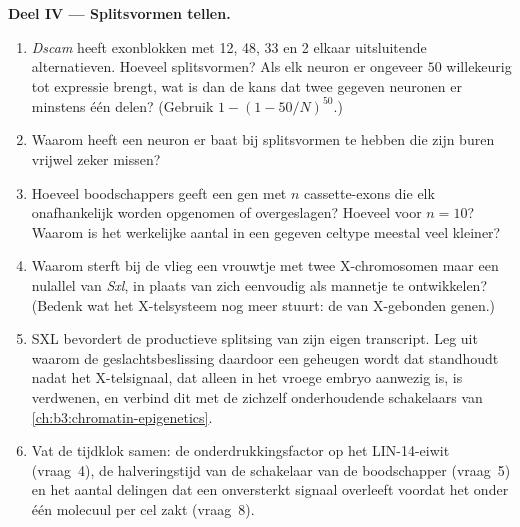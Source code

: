 \begin{problem}
\medskip
\noindent\textbf{Deel IV --- Splitsvormen tellen.}
\begin{enumerate}[resume]
  \item \emph{Dscam} heeft exonblokken met 12, 48, 33 en 2 elkaar
        uitsluitende alternatieven. Hoeveel splitsvormen? Als elk
        neuron er ongeveer $50$ willekeurig tot expressie brengt, wat
        is dan de kans dat twee gegeven neuronen er minstens één
        delen? (Gebruik $1 - (1 -
        50/N)^{50}$.)
  \item Waarom heeft een neuron er baat bij splitsvormen te hebben die
        zijn buren vrijwel zeker missen?
  \item Hoeveel boodschappers geeft een gen met $n$ cassette-exons die
        elk onafhankelijk worden opgenomen of overgeslagen? Hoeveel
        voor $n = 10$? Waarom is het werkelijke aantal in een gegeven
        celtype meestal veel kleiner?
  \item Waarom sterft bij de vlieg een vrouwtje met twee X-chromosomen
        maar een nulallel van \emph{Sxl}, in plaats van zich eenvoudig
        als mannetje te ontwikkelen? (Bedenk wat het X-telsysteem nog
        meer stuurt: de  van X-gebonden genen.)
  \item SXL bevordert de productieve splitsing van zijn eigen
        transcript. Leg uit waarom de geslachtsbeslissing daardoor een
        geheugen wordt dat standhoudt nadat het X-telsignaal, dat
        alleen in het vroege embryo aanwezig is, is verdwenen, en
        verbind dit met de zichzelf onderhoudende schakelaars van
        \cref{ch:b3:chromatin-epigenetics}.
  \item Vat de tijdklok samen: de onderdrukkingsfactor op het
        LIN-14-eiwit (vraag~4), de halveringstijd van de schakelaar van
        de boodschapper (vraag~5) en het aantal delingen dat een
        onversterkt signaal overleeft voordat het onder één molecuul
        per cel zakt (vraag~8).
\end{enumerate}
\end{problem}
